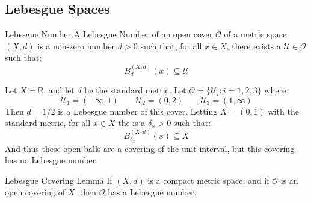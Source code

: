 \documentclass[crop=false,class=book,oneside]{standalone}
\begin{document}
        \subsection{Lebesgue Spaces}
            \begin{ldefinition}{Lebesgue Number}
                A Lebesgue Number of an open cover
                $\mathcal{O}$ of a metric space $(X,d)$ is
                a non-zero number $d>0$ such that, for all
                $x\in{X}$, there exists
                a $\mathcal{U}\in\mathcal{O}$ such that:
                \begin{equation}
                    B_{d}^{(X,d)}(x)\subseteq\mathcal{U}
                \end{equation}
            \end{ldefinition}
            \begin{lexample}
                Let $X=\mathbb{R}$, and let $d$ be the
                standard metric. Let
                $\mathcal{O}=\{\mathcal{U}_{i}:i=1,2,3\}$ where:
                \begin{equation}
                    \mathcal{U}_{1}=(-\infty,1)
                    \quad\quad
                    \mathcal{U}_{2}=(0,2)
                    \quad\quad
                    \mathcal{U}_{3}=(1,\infty)
                \end{equation}
                Then $d=1/2$ is a Lebesgue number of this cover.
                Letting $X=(0,1)$ with the standard metric, for all
                $x\in{X}$ the is a $\delta_{x}>0$ such that:
                \begin{equation}
                    B_{\delta_{x}}^{(X,d)}(x)
                    \subseteq{X}
                \end{equation}
                And thus these open balls are a covering of the unit
                interval, but this covering has no Lebesgue number.
            \end{lexample}
            \begin{ltheorem}{Lebesgue Covering Lemma}
                If $(X,d)$ is a compact metric space, and if
                $\mathcal{O}$ is an open covering of $X$, then
                $\mathcal{O}$ has a Lebesgue number.
            \end{ltheorem}
\end{document}
